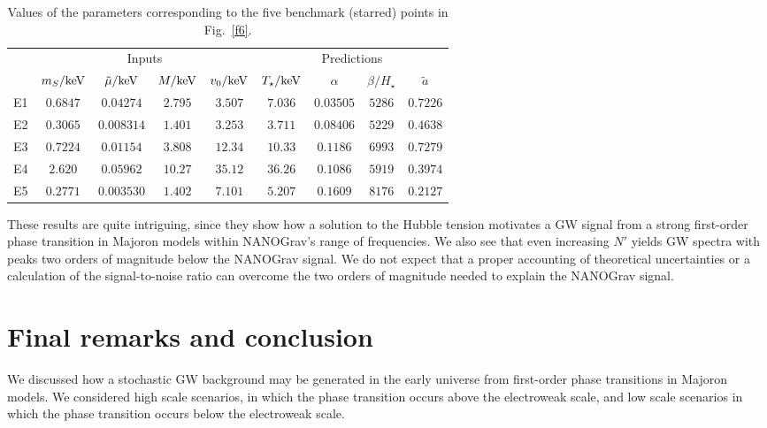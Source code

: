\documentclass[a4paper,11pt]{article}
\begin{document}
\begin{table}[t]
\begin{center}
\begin{tabular}{ l | cccc | cccc }
 \hline\hline
& \multicolumn{4}{c|}{Inputs} & \multicolumn{4}{c}{Predictions} \\
 \cline{2-9}
 &  $m_S/{\rm keV}$ & $\tilde{\mu}/{\rm keV}$ & $M/{\rm keV}$ & $v_0/{\rm keV}$ & $T_\star/{\rm keV}$ & $\alpha$ & $\beta / H_\star$ & $\widetilde{a}$  \\\hline\hline
E1 & $0.6847$ & $0.04274$ & $2.795$ & $3.507$ & $7.036$ & $0.03505$ & $5286$ & $0.7226$ \\
E2 & $0.3065$ & $0.008314$ & $1.401$ & $3.253$ & $3.711$ & $0.08406$ & $5229$ & $0.4638$ \\
E3 & $0.7224$ & $0.01154$ & $3.808$ & $12.34$ & $10.33$ & $0.1186$ & $6993$ & $0.7279$ \\
E4 & $2.620$ & $0.05962$ & $10.27$ & $35.12$ & $36.26$ & $0.1086$ & $5919$ & $0.3974$ \\
E5 & $0.2771$ & $0.003530$ & $1.402$ & $7.101$ & $5.207$ & $0.1609$ & $8176$ & $0.2127$ \\
 \hline\hline
\end{tabular}
\end{center}
\caption{Values of the parameters corresponding to the five benchmark (starred) points in Fig.~\ref{f6}.
}
\label{tab:samples_lowT3}
\end{table}

These results are quite intriguing,  since they show how a solution to the Hubble tension motivates a GW signal from a strong first-order phase transition in Majoron models  within NANOGrav's range of frequencies. We also see that even increasing $N'$ yields GW spectra
with peaks two orders of magnitude below the NANOGrav signal. We do not expect that a proper accounting of theoretical uncertainties or a calculation of the signal-to-noise ratio can overcome the two orders of magnitude needed to explain the NANOGrav signal.


\section{Final remarks and conclusion}

We discussed how a stochastic GW background may be generated in the early universe from
first-order phase transitions in Majoron models. We considered high scale scenarios, in which the
phase transition occurs above the electroweak scale, and  low scale scenarios in which the phase transition occurs below the electroweak scale.
\end{document}
